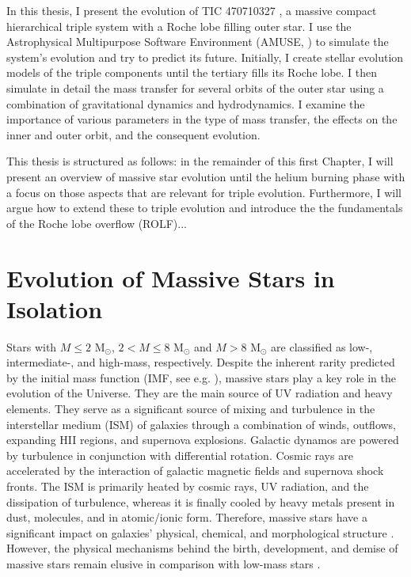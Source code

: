 In this thesis, I present the evolution of TIC 470710327 \citep{eisner2022planet}, a massive compact hierarchical triple system with a Roche lobe filling outer star. I use the Astrophysical Multipurpose Software Environment (AMUSE, \cite{portegies2018astrophysical}) to simulate the system's evolution and try to predict its future. Initially, I create stellar evolution models of the triple components until the tertiary fills its Roche lobe. I then simulate in detail the mass transfer for several orbits of the outer star using a combination of gravitational dynamics and hydrodynamics. I examine the importance of various parameters in the type of mass transfer, the effects on the inner and outer orbit, and the consequent evolution.

This thesis is structured as follows: in the remainder of this first Chapter, I will present an overview of massive star evolution until the helium burning phase with a focus on those aspects that are relevant for triple evolution. Furthermore, I will argue  how to extend these to triple evolution and introduce the the fundamentals of the Roche lobe overflow (ROLF)...


\section{Evolution of Massive Stars in Isolation}

Stars with $M \leq 2$ M$_{\odot}$, $2 < M \leq 8$ M$_{\odot}$ and $M > 8$ M$_{\odot}$ are classified as low-, intermediate-, and high-mass, respectively. Despite the inherent rarity predicted by the initial mass function (IMF, see e.g. \cite{chabrier2005initial, dib2018emergence}), massive stars play a key role in the evolution of the Universe. They are the main source of UV radiation and heavy elements. They serve as a significant source of mixing and turbulence in the interstellar medium (ISM) of galaxies through a combination of winds, outflows, expanding HII regions, and supernova explosions. Galactic dynamos are powered by turbulence in conjunction with differential rotation. Cosmic rays are accelerated by the interaction of galactic magnetic fields and supernova shock fronts. The ISM is primarily heated by cosmic rays, UV radiation, and the dissipation of turbulence, whereas it is finally cooled by heavy metals present in dust, molecules, and in atomic/ionic form. Therefore, massive stars have a significant impact on galaxies' physical, chemical, and morphological structure \citep{kennicutt2005role}. However, the physical mechanisms behind the birth, development, and demise of massive stars remain elusive in comparison with low-mass stars \citep{zinnecker2007toward}. 


